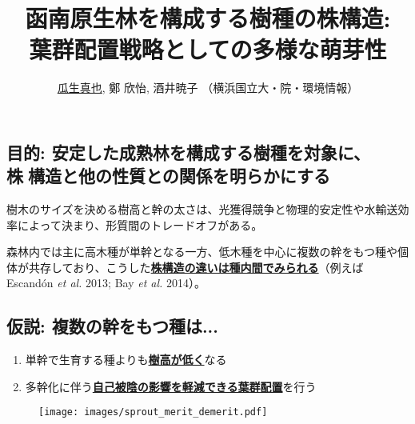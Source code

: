 \documentclass[a0, 30pt, plainboxedsections]{sciposter} %
\title{\textcolor{Blue1}{函南原生林を構成する樹種の株構造:\\\vspace{-0.2em} 葉群配置戦略としての多様な萌芽性}}
\author{\underline{瓜生真也}, 鄭 欣怡, 酒井暁子 （横浜国立大・院・環境情報） \normalsize{\faEnvelope \hspace{0.02em} \fontspec{GillSans-Italic}{suika1127@gmail.com}}}
\begin{document}
\maketitle
\vspace{-2em}
\begin{mdframed}[style=section.frame]
  \centering\LARGE\textbf{\color{white}{はじめに}}
\end{mdframed}

\begin{multicols}{2}

\subsection*{目的: 安定した成熟林を構成する樹種を対象に、\\株構造と他の性質との関係を明らかにする}

樹木のサイズを決める樹高と幹の太さは、光獲得競争と物理的安定性や水輸送効率によって決まり、形質間のトレードオフがある。

森林内では主に高木種が単幹となる一方、低木種を中心に複数の幹をもつ種や個体が共存しており、こうした\textbf{\underline{株構造の違いは種内間でみられる}}（例えばEscandón \textit{et al.} 2013; Bay \textit{et al.} 2014）。

\columnbreak
\subsection*{仮説: 複数の幹をもつ種は...}

\begin{enumerate}\setlength{\itemindent}{1em}
\item 単幹で生育する種よりも\underline{\textbf{樹高が低く}}なる
\item 多幹化に伴う\underline{\textbf{自己被陰の影響を軽減できる葉群配置}}を行う
\end{enumerate}

\begin{figure}
  \centering\texttt{[image: images/sprout\_merit\_demerit.pdf]}
\end{figure}
\end{multicols}
\begin{mdframed}[style=section.frame]
  \centering\LARGE\textbf{\color{white}{方法}}
\end{mdframed}
\end{document}
